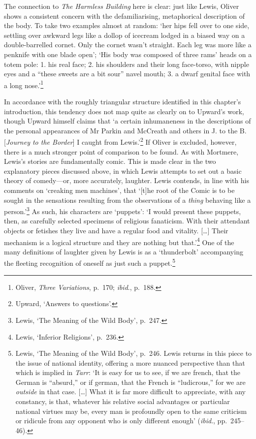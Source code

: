\documentclass[]{article}
\begin{document}
\noindent The connection to \emph{The Harmless Building} here is clear:
just like Lewis, Oliver shows a consistent concern with the
defamiliarising, metaphorical description of the body. To take two
examples almost at random: `her hips fell over to one side, settling
over awkward legs like a dollop of icecream lodged in a biased way on a
double-barrelled cornet. Only the cornet wasn't straight. Each leg was
more like a penknife with one blade open'; `His body was composed of
three rams' heads on a totem pole: 1. his real face; 2. his shoulders
and their long face-torso, with nipple eyes and a ``these sweets are a
bit sour'' navel mouth; 3. a dwarf genital face with a long
nose.'\footnote{Oliver, \emph{Three Variations}, p.~170; \emph{ibid}.,
  p.~188.}

In accordance with the roughly triangular structure identified in this
chapter's introduction, this tendency does not map quite as clearly on
to Upward's work, though Upward himself claims that `a certain
inhumaneness in the descriptions of the personal appearances of Mr
Parkin and McCreath and others in J. to the B. {[}\emph{Journey to the
Border}{]} I caught from Lewis.'\footnote{Upward, `Answers to
  questions'.} If Oliver is excluded, however, there is a much stronger
point of comparison to be found. As with Mortmere, Lewis's stories are
fundamentally comic. This is made clear in the two explanatory pieces
discussed above, in which Lewis attempts to set out a basic theory of
comedy---or, more accurately, laughter. Lewis contends, in line with his
comments on `creaking men machines', that `{[}t{]}he root of the Comic
is to be sought in the sensations resulting from the observations of a
\emph{thing} behaving like a person.'\footnote{Lewis, `The Meaning of
  the Wild Body', p.~247.} As such, his characters are `puppets': `I
would present these puppets, then, as carefully selected specimens of
religious fanaticism. With their attendant objects or fetishes they live
and have a regular food and vitality. {[}\ldots{}{]} Their mechanism is
a logical structure and they are nothing but that.'\footnote{Lewis,
  `Inferior Religions', p.~236.} One of the many definitions of laughter
given by Lewis is as a `thunderbolt' accompanying the fleeting
recognition of oneself as just such a puppet.\footnote{Lewis, `The
  Meaning of the Wild Body', p.~246. Lewis returns in this piece to the
  issue of national identity, offering a more nuanced perspective than
  that which is implied in \emph{Tarr}: `It is easy for us to see, if we
  are french, that the German is ``absurd,'' or if german, that the
  French is ``ludicrous,'' for we are \emph{outside} in that case.
  {[}\ldots{}{]} What it is far more difficult to appreciate, with any
  constancy, is that, whatever his relative social advantages or
  particular national virtues may be, every man is profoundly open to
  the same criticism or ridicule from any opponent who is only different
  enough' (\emph{ibid}., pp.~245--46).}
\end{document}
